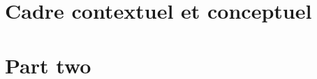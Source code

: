 \documentclass[12pt]{report}
\begin{document}


\listoffigures  %



\tableofcontents
%
\part{Cadre contextuel et conceptuel}
%

\part{Part two}
%
%
\newpage




\printglossaries
\end{document}
